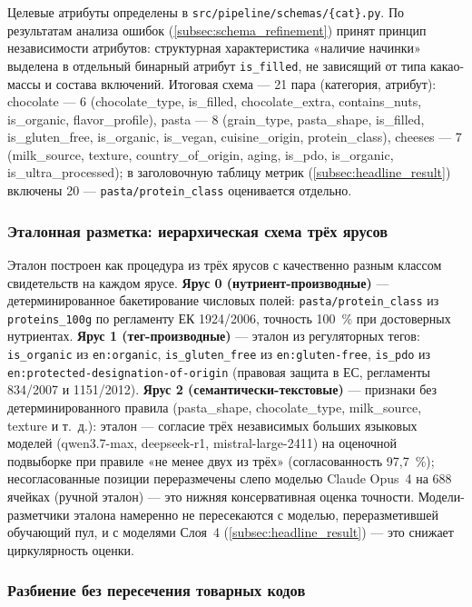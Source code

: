 Целевые атрибуты определены в \texttt{src/pipeline/schemas/\{cat\}.py}. По результатам анализа ошибок (\ref{subsec:schema_refinement}) принят принцип независимости атрибутов: структурная характеристика «наличие начинки» выделена в отдельный бинарный атрибут \texttt{is\_filled}, не зависящий от типа какао-массы и состава включений. Итоговая схема — 21 пара (категория, атрибут): chocolate — 6 (chocolate\_type, is\_filled, chocolate\_extra, contains\_nuts, is\_organic, flavor\_profile), pasta — 8 (grain\_type, pasta\_shape, is\_filled, is\_gluten\_free, is\_organic, is\_vegan, cuisine\_origin, protein\_class), cheeses — 7 (milk\_source, texture, country\_of\_origin, aging, is\_pdo, is\_organic, is\_ultra\_processed); в заголовочную таблицу метрик (\ref{subsec:headline_result}) включены 20 — \texttt{pasta/protein\_class} оценивается отдельно.

\subsubsection{Эталонная разметка: иерархическая схема трёх ярусов}
\label{subsubsec:gold_labeling}

Эталон построен как процедура из трёх ярусов с качественно разным классом свидетельств на каждом ярусе. \textbf{Ярус 0 (нутриент-производные)} — детерминированное бакетирование числовых полей: \texttt{pasta/protein\_class} из \texttt{proteins\_100g} по регламенту ЕК 1924/2006, точность 100~\% при достоверных нутриентах. \textbf{Ярус 1 (тег-производные)} — эталон из регуляторных тегов: \texttt{is\_organic} из \texttt{en:organic}, \texttt{is\_gluten\_free} из \texttt{en:gluten-free}, \texttt{is\_pdo} из \texttt{en:protected-designation-of-origin} (правовая защита в ЕС, регламенты 834/2007 и 1151/2012). \textbf{Ярус 2 (семантически-текстовые)} — признаки без детерминированного правила (pasta\_shape, chocolate\_type, milk\_source, texture и т.~д.): эталон — согласие трёх независимых больших языковых моделей (qwen3.7-max, deepseek-r1, mistral-large-2411) на оценочной подвыборке при правиле «не менее двух из трёх» (согласованность 97,7~\%); несогласованные позиции переразмечены слепо моделью Claude Opus~4 на 688 ячейках (ручной эталон) — это нижняя консервативная оценка точности. Модели-разметчики эталона намеренно не пересекаются с моделью, переразметившей обучающий пул, и с моделями Слоя~4 (\ref{subsec:headline_result}) — это снижает циркулярность оценки.

\subsubsection{Разбиение без пересечения товарных кодов}
\label{subsubsec:code_disjoint}

